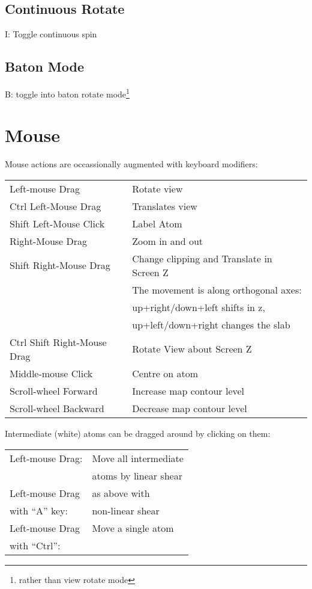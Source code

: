 \documentclass[twocolumn]{article}
\begin{document}
\subsection{Continuous Rotate}
I: Toggle continuous spin

\subsection{Baton Mode}
B: toggle into baton rotate mode\footnote{rather than view rotate
  mode}

\newpage
\section{Mouse}
Mouse actions are occassionally augmented with keyboard modifiers:
  \vspace{5mm}

  \begin{tabular}{ll}
    Left-mouse Drag & Rotate view \\
    Ctrl Left-Mouse Drag &  Translates view \\
    Shift Left-Mouse Click &  Label Atom\\
    Right-Mouse Drag &  Zoom in and out\index{zoom}\\
    Shift Right-Mouse Drag & Change clipping and Translate in Screen Z \\
    & The movement is along orthogonal axes: \\
    & up+right/down+left shifts in z, \\ 
    &  up+left/down+right changes the slab \\
    Ctrl Shift Right-Mouse Drag &  Rotate View about Screen Z\\
    Middle-mouse Click & Centre on atom\\
    Scroll-wheel Forward &  Increase map contour level\\
    Scroll-wheel Backward &  Decrease map contour level
  \end{tabular}

  \vspace{5mm}
  Intermediate (white) atoms can be dragged around by clicking on
  them:

  \vspace{5mm}
\begin{tabular}{ll}
 Left-mouse Drag:     & Move all intermediate \\
                      & atoms by linear shear \\
 Left-mouse Drag  & as above with\\
  with ``A'' key:
                                 &  non-linear shear\\
 Left-mouse Drag & Move a single atom\\
 with ``Ctrl'': 
\end{tabular}
\end{document}
